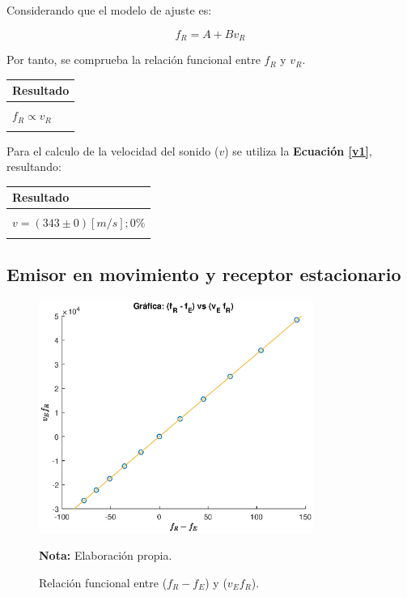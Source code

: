 \documentclass[letter,11pt]{article}
\newcommand{\source}[1]{\vspace{-11pt} \caption*{\small{\textbf{Nota:} {#1}}}}
\begin{document}
Considerando que el modelo de ajuste es:

\begin{equation*}
    f_R = A + B v_R
\end{equation*}
\vspace{0.10cm}

Por tanto, se comprueba la relación funcional entre $f_R$ y $v_R$.

\begin{center}
\begin{tabular}{|>{\centering}m{9.2cm}<{\centering}|}
\hline
\textbf{Resultado} 
\tabularnewline \hline
\\
$f_R \propto v_R$ \tabularnewline
\\
\hline
\end{tabular}
\end{center}

Para el calculo de la velocidad del sonido ($v$) se utiliza la
\textbf{Ecuación \ref{v1}}, resultando:

\begin{center}
\begin{tabular}{|>{\centering}m{9.2cm}<{\centering}|}
\hline
\textbf{Resultado} 
\tabularnewline \hline
\\
$v = (343 \pm 0) [m/s]; 0\%$ \tabularnewline
\\
\hline
\end{tabular}
\end{center}

\subsection{Emisor en movimiento y receptor estacionario}

\begin{figure}
\centering
\includegraphics[width=0.80\textwidth]{resources/m2.eps}
\caption{Relación funcional entre ($f_R - f_E$) y ($v_E f_R$).}
\label{figura6}
\source{Elaboración propia.}
\end{figure}
\end{document}
